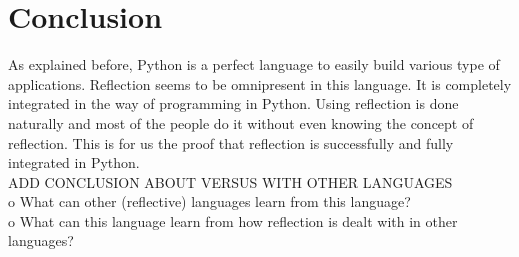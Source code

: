 \section{Conclusion}

As explained before, Python is a perfect language to easily build various type of applications. 
Reflection seems to be omnipresent in this language. 
It is completely integrated in the way of programming in Python.
Using reflection is done naturally and most of the people do it without even knowing the concept of reflection. 
This is for us the proof that reflection is successfully and fully integrated in Python.
\\
ADD CONCLUSION ABOUT VERSUS WITH OTHER LANGUAGES\\
o	What can other (reflective) languages learn from this language?\\
o	What can this language learn from how reflection is dealt with in other languages?\\